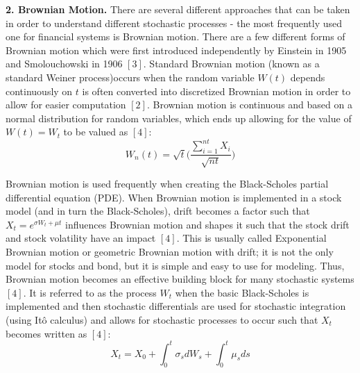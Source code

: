 \documentclass{report}
\begin{document}
	\textbf{2. Brownian Motion.}  There are several different approaches that can be taken in order to understand different stochastic processes - the most frequently used one for financial systems is Brownian motion. There are a few different forms of Brownian motion which were first introduced independently by Einstein in 1905 and Smolouchowski in 1906 $[3]$. Standard Brownian motion (known as a standard Weiner process)occurs when the random variable $W(t)$ depends continuously on $t$ is often converted into discretized Brownian motion in order to allow for easier computation $[2]$. Brownian motion is continuous and based on a normal distribution for random variables, which ends up allowing for the value of $W(t)=W_t$ to be valued as $[4]$: \\
	\[W_n(t) = \sqrt{t}\bigg(\frac{\sum_{i=1}^{nt} X_i}{\sqrt{nt}}\bigg) \]\vspace{0.1cm}
	
	Brownian motion is used frequently when creating the Black-Scholes partial differential equation (PDE). When Brownian motion is implemented in a stock model (and in turn the Black-Scholes), drift becomes a factor such that $X_t = e^{\sigma W_t + \mu t}$ influences Brownian motion and shapes it such that the stock drift and stock volatility have an impact $[4]$. This is usually called Exponential Brownian motion or geometric Brownian motion with drift; it is not the only model for stocks and bond, but it is simple and easy to use for modeling. Thus, Brownian motion becomes an effective building block for many stochastic systems $[4]$. 	It is referred to as the process $W_t$ when the basic Black-Scholes is implemented and then stochastic differentials are used for stochastic integration (using It\^{o} calculus) and allows for stochastic processes to occur such that $X_t$ becomes written as $[4]$: \\
	\[X_t = X_0 + \int_{0}^{t}\sigma_s dW_s + \int_{0}^{t}\mu_s ds\]
	\vspace{0.1cm}
	
\end{document}

